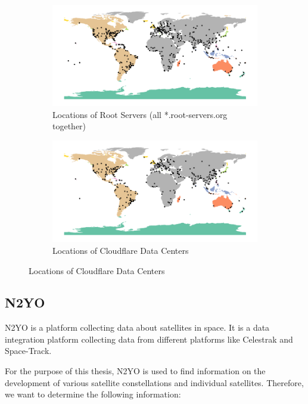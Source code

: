 \begin{figure}
	\begin{subfigure}[t]{0.48\textwidth}
		\includegraphics[width=\textwidth]{./chapters/3-methodology/img/rootserver-locations.png}
		\caption{Locations of Root Servers (all *.root-servers.org
			together) \cite{rootservers092024}}
	\end{subfigure}
	\begin{subfigure}[t]{0.48\textwidth}
		\includegraphics[width=\textwidth]{./chapters/3-methodology/img/cloudflare-datacenter-locations.png}
		\caption{Locations of Cloudflare Data Centers
			\cite{CloudflareGlobalNetwork2024}}
	\end{subfigure}
\end{figure}

\subsection{N2YO} \label{sec:n2yo}

N2YO is a platform collecting data about satellites in space. It is a data
integration platform collecting data from different platforms like Celestrak
and Space-Track.

For the purpose of this thesis, N2YO is used to find information on the
development of various satellite constellations and individual satellites.
Therefore, we want to determine the following information:

